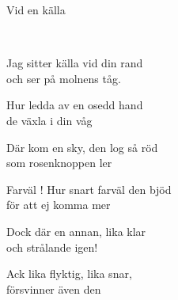 \begin{song}{Vid en källa}
	
	
	\\
	
	
	Jag sitter källa vid din rand\\
	och ser på molnens tåg.\\
	\begin{repetition}
		Hur ledda av en osedd hand\\
		de växla i din våg
	\end{repetition}
	
	Där kom en sky, den log så röd\\
	som rosenknoppen ler\\
	\begin{repetition}
		Farväl ! Hur snart farväl den bjöd\\
		för att ej komma mer
	\end{repetition}
	
	Dock där en annan, lika klar\\
	och strålande igen!\\
	\begin{repetition}
		Ack lika flyktig, lika snar,\\
		försvinner även den
	\end{repetition}
	
\end{song}

